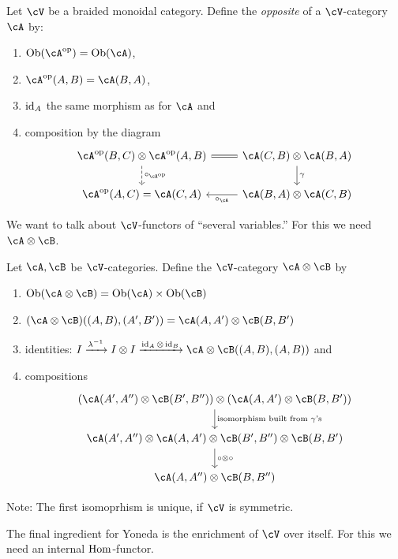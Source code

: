 \documentclass[a4paper,11pt,oneside,openany]{scrbook}
\begin{document}
\begin{defn}
	Let $ \cV $ be a braided monoidal category.
	Define the \emph{opposite} of a $ \cV $-category~$ \cA $ by:
	\begin{enumerate}[label=$\bullet$]
		\item $ \Ob(\cA^{\op}) = \Ob(\cA) $,
		\item $ \cA^{\op}(A,B) = \cA(B,A) $,
		\item $ \operatorname{id}_A $ the same morphism as for $ \cA $ and
		\item composition by the diagram
		      \begin{displaymath}
			      \begin{tikzcd}
				      \cA^{\op}(B,C)\otimes \cA^{\op}(A,B)\arrow[r, equal] \arrow[d, dashed, "\circ_{\cA^{\op}}"]& \cA(C,B)\otimes \cA(B,A) \arrow[d, "\gamma"] \\
				      \cA^{\op}(A,C) = \cA(C,A) & \cA(B,A)\otimes \cA(C,B) \arrow[l, "\circ_\cA"]
			      \end{tikzcd}
		      \end{displaymath}
	\end{enumerate}
\end{defn}
We want to talk about $ \cV $-functors of ``several variables.''
For this we need $ \cA \otimes \cB$.
\begin{defn}
	Let $ \cA,\cB $ be $ \cV $-categories.
	Define the $ \cV $-category $ \cA \otimes \cB $ by
	\begin{enumerate}[label=$ \bullet $]
		\item $ \Ob(\cA\otimes \cB) = \Ob(\cA) \times \Ob(\cB) $
		\item $ (\cA\otimes\cB)((A,B),(A',B')) = \cA(A,A')\otimes \cB(B,B') $
        \item identities: $ I \xrightarrow{\lambda^{-1}} I\otimes I \xrightarrow{\id_A \otimes \id_B} \cA\otimes\cB((A,B),(A,B)) $ and
		\item compositions
		      \begin{displaymath}
			      \begin{tikzcd}
				      (\cA(A',A'') \otimes \cB(B',B'')) \otimes (\cA(A,A') \otimes \cB(B,B'))
				      \arrow[d, "\text{isomorphism built from $ \gamma $'s}"]
				      \\
				      \cA(A',A'') \otimes \cA(A,A')\otimes \cB(B',B'')\otimes \cB(B,B')
				      \arrow[d, "\circ\otimes\circ"]\\
				      \cA(A,A'')\otimes \cB(B,B'')
			      \end{tikzcd}
		      \end{displaymath}
	\end{enumerate}
	Note: The first isomoprhism is unique, if $ \cV $ is symmetric.
\end{defn}
The final ingredient for Yoneda is the enrichment of $ \cV $ over itself.
For this we need an internal $ \operatorname{\text{Hom}} $-functor.
\end{document}
